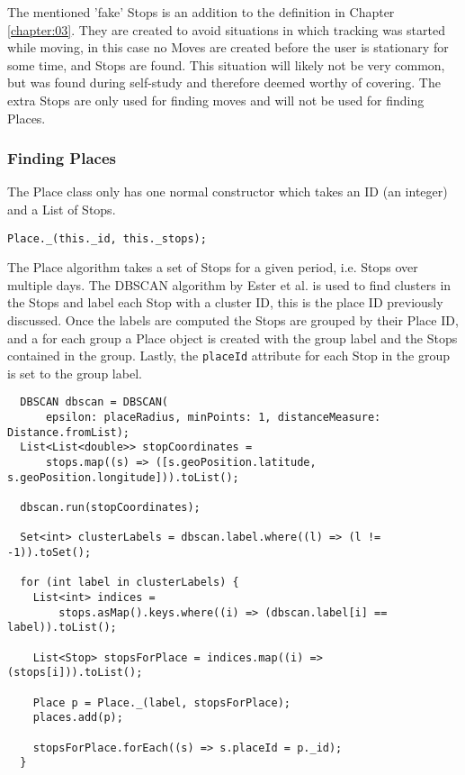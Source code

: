 The mentioned 'fake' Stops is an addition to the definition in Chapter \ref{chapter:03}. They are created to avoid situations in which tracking was started while moving, in this case no Moves are created before the user is stationary for some time, and Stops are found. This situation will likely not be very common, but was found during self-study and therefore deemed worthy of covering. The extra Stops are only used for finding moves and will not be used for finding Places.

\subsubsection{Finding Places}
The Place class only has one normal constructor which takes an ID (an integer) and a List of Stops. 
\begin{verbatim}
Place._(this._id, this._stops);
\end{verbatim}

The Place algorithm takes a set of Stops for a given period, i.e. Stops over multiple days. The DBSCAN algorithm by Ester et al. \cite{density-based-1996} is used to find clusters in the Stops and label each Stop with a cluster ID, this is the place ID previously discussed. Once the labels are computed the Stops are grouped by their Place ID, and a for each group a Place object is created with the group label and the Stops contained in the group. Lastly, the \verb|placeId| attribute for each Stop in the group is set to the group label.

\begin{verbatim}
  DBSCAN dbscan = DBSCAN(
      epsilon: placeRadius, minPoints: 1, distanceMeasure: Distance.fromList);
  List<List<double>> stopCoordinates =
      stops.map((s) => ([s.geoPosition.latitude, s.geoPosition.longitude])).toList();

  dbscan.run(stopCoordinates);

  Set<int> clusterLabels = dbscan.label.where((l) => (l != -1)).toSet();

  for (int label in clusterLabels) {
    List<int> indices =
        stops.asMap().keys.where((i) => (dbscan.label[i] == label)).toList();

    List<Stop> stopsForPlace = indices.map((i) => (stops[i])).toList();

    Place p = Place._(label, stopsForPlace);
    places.add(p);

    stopsForPlace.forEach((s) => s.placeId = p._id);
  }
\end{verbatim}


